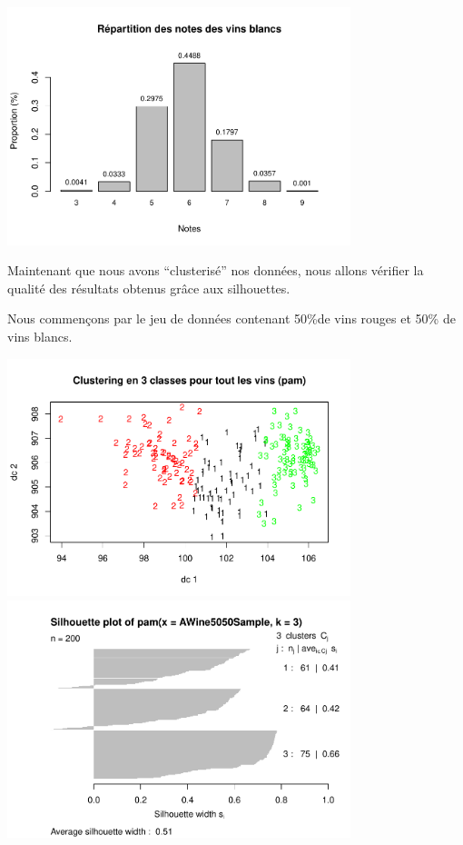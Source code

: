 \documentclass[
]{article}
\begin{document}
\begin{center}
	\includegraphics[width=10cm]{repport_files/figure-latex/unnamed-chunk-11-1.pdf}
\end{center}

Maintenant que nous avons ``clusterisé'' nos données, nous allons
vérifier la qualité des résultats obtenus grâce aux silhouettes.

Nous commençons par le jeu de données contenant 50\%de vins rouges et
50\% de vins blancs.
\begin{center}
	\includegraphics[width=10cm]{repport_files/figure-latex/unnamed-chunk-12-1.pdf}
\includegraphics[width=10cm]{repport_files/figure-latex/unnamed-chunk-12-2.pdf}
\end{center}
\end{document}
